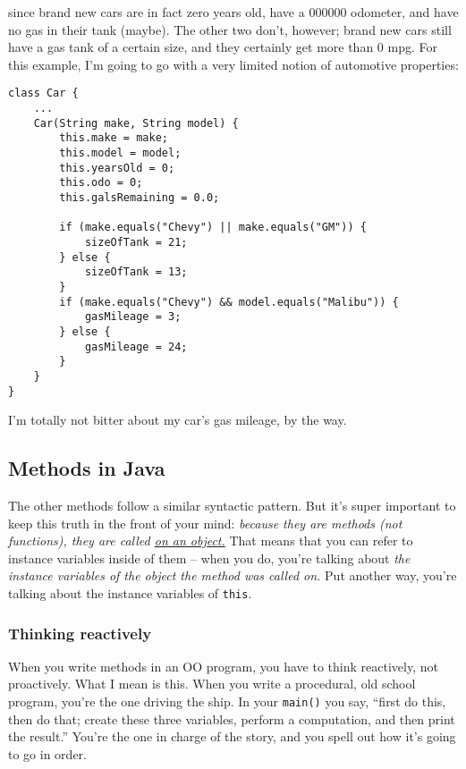 since brand new cars are in fact zero years old, have a 000000 odometer, and
have no gas in their tank (maybe). The other two don't, however; brand new
cars still have a gas tank of a certain size, and they certainly get more than
0 mpg. For this example, I'm going to go with a very limited notion of
automotive properties:

\begin{Verbatim}[samepage=true,fontsize=\footnotesize,frame=single]
class Car {
    ...
    Car(String make, String model) {
        this.make = make;
        this.model = model;
        this.yearsOld = 0;
        this.odo = 0;
        this.galsRemaining = 0.0;
        
        if (make.equals("Chevy") || make.equals("GM")) {
            sizeOfTank = 21;
        } else {
            sizeOfTank = 13;
        }
        if (make.equals("Chevy") && model.equals("Malibu")) {
            gasMileage = 3;
        } else {
            gasMileage = 24;
        }
    }
}
\end{Verbatim}

I'm totally not bitter about my car's gas mileage, by the way.

\subsection{Methods in Java}

The other methods follow a similar syntactic pattern. But it's super important
to keep this truth in the front of your mind: \textit{because they are methods
(not functions), they are called \underline{on an object.}} That means that
you can refer to instance variables inside of them -- when you do, you're
talking about \textit{the instance variables of the object the method was
called on.} Put another way, you're talking about the instance variables of
\texttt{this}.

\subsubsection{Thinking reactively}

When you write methods in an OO program, you have to think reactively, not
proactively. What I mean is this. When you write a procedural, old school
program, you're the one driving the ship. In your \texttt{main()} you say,
``first do this, then do that; create these three variables, perform a
computation, and then print the result.'' You're the one in charge of the
story, and you spell out how it's going to go in order.

